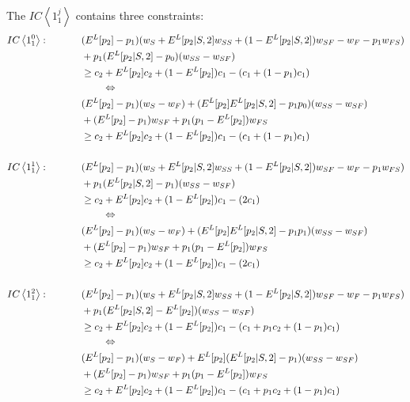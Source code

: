 \documentclass[11pt]{article} %
\theoremstyle{exampstyle}
\newcommand{\eq}[1]{\begin{align}#1\end{align}}
\newcommand{\la}{ \left < }
\newcommand{\ra}{ \right > }
\begin{document}
The $IC\la 1^j_1 \ra$ contains three constraints:
\eq{
IC\la1^0_1\ra: \hspace{.5in} &(E^L[p_2] -p_1)(w_S+E^L[p_2|S,2]w_{SS}+(1-E^L[p_2|S,2])w_{SF}-w_F-p_1w_{FS}) \notag \\
&+p_1(E^L[p_2|S,2]-p_0 )(w_{SS}-w_{SF})  \notag \\
& \ge c_2+E^L[p_2]c_2+(1-E^L[p_2])c_1-(c_1+(1-p_1)c_1) \notag \\
& \hspace{.3in} \Leftrightarrow \notag \\
& (E^L[p_2]-p_1)(w_S-w_F) + (E^L[p_2] E^L[p_2 | S,2] - p_1 p_0 )( w_{SS} -w_{SF} ) \notag \\
& +(E^L[p_2]-p_1) w_{SF} + p_1 (p_1-E^L[p_2]) w_{FS}  \notag \\
& \ge c_2 + E^L[p_2] c_2 + (1-E^L[p_2]) c_1 - (c_1 + (1-p_1) c_1 ) \notag \\
\notag 
\\
IC\la1^1_1\ra:\hspace{.5in} &(E^L[p_2] -p_1)(w_S+E^L[p_2|S,2]w_{SS}+(1-E^L[p_2|S,2])w_{SF}-w_F-p_1w_{FS}) \notag \\
&+p_1(E^L[p_2|S,2]-p_1)(w_{SS}-w_{SF})  \notag \\
& \ge c_2+E^L[p_2]c_2+(1-E^L[p_2])c_1-(2 c_1) \notag \\
& \hspace{.3in} \Leftrightarrow \notag \\
& (E^L[p_2]-p_1)(w_S-w_F) + (E^L[p_2] E^L[p_2 | S,2] - p_1 p_1 )( w_{SS} -w_{SF} ) \notag \\
& +(E^L[p_2]-p_1) w_{SF} + p_1 (p_1-E^L[p_2]) w_{FS}    \notag \\
& \ge c_2 + E^L[p_2] c_2 + (1-E^L[p_2]) c_1 - (2 c_1  ) \notag \\
\notag 
\\
IC\la1^2_1\ra: \hspace{.5in} &(E^L[p_2] -p_1)(w_S+E^L[p_2|S,2]w_{SS}+(1-E^L[p_2|S,2])w_{SF}-w_F-p_1w_{FS}) \notag \\
&+p_1(E^L[p_2|S,2]-E^L[p_2])(w_{SS}-w_{SF})  \notag \\
& \ge c_2+E^L[p_2]c_2+(1-E^L[p_2])c_1-(c_1+p_1c_2+(1-p_1)c_1) \notag \\
& \hspace{.3in} \Leftrightarrow \notag \\ 
& (E^L[p_2]-p_1)(w_S-w_F) + E^L[p_2]( E^L[p_2 | S,2] - p_1 )( w_{SS} -w_{SF} ) \notag \\
& +(E^L[p_2]-p_1) w_{SF} + p_1 (p_1-E^L[p_2]) w_{FS} \notag \\
& \ge c_2 + E^L[p_2] c_2 + (1-E^L[p_2]) c_1 - (c_1 + p_1 c_2 +(1-p_1) c_1 ) \notag
}
\end{document}

